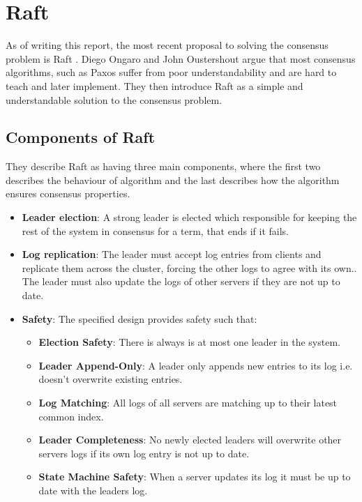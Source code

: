 \section{Raft}
As of writing this report, the most recent proposal to solving the consensus problem is Raft \cite{Raft}. Diego Ongaro and John Oustershout argue that most consensus algorithms, such as Paxos \cite{Paxos} suffer from poor understandability and are hard to teach and later implement. They then introduce Raft as a simple and understandable solution to the consensus problem. 
\subsection{Components of Raft}
They describe Raft as having three main components, where the first two describes the behaviour of algorithm and the last describes how the algorithm ensures consensus properties.
\begin{itemize}
\item \textbf{Leader election}: A strong leader is elected which responsible for keeping the rest of the system in consensus for a term, that ends if it fails.
\item \textbf{Log replication}: The leader must accept log entries from clients and replicate them across the cluster, forcing the other logs to agree with its own.\cite{Raft}. The leader must also update the logs of other servers if they are not up to date.
\item \textbf{Safety}: The specified design provides safety such that\cite{Raft}: 
    \begin{itemize}
    \item \textbf{Election Safety}: There is always is at most one leader in the system.
    \item \textbf{Leader Append-Only}: A leader only appends new entries to its log i.e. doesn't overwrite existing entries.
    \item \textbf{Log Matching}: All logs of all servers are matching up to their latest common index.
    \item \textbf{Leader Completeness}: No newly elected leaders will overwrite other servers logs if its own log entry is not up to date.
    \item \textbf{State Machine Safety}: When a server updates its log it must be up to date with the leaders log.
    \end{itemize}
\end{itemize}
